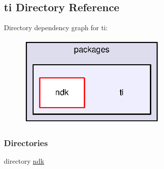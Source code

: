 \subsection{ti Directory Reference}
\label{dir_3f051719e97ef21bd60ea5e21f7dc6b4}
Directory dependency graph for ti\+:
\nopagebreak
\begin{figure}[H]
\begin{center}
\leavevmode
\includegraphics[width=211pt]{dir_3f051719e97ef21bd60ea5e21f7dc6b4_dep}
\end{center}
\end{figure}
\subsubsection*{Directories}
\begin{DoxyCompactItemize}
\item 
directory \hyperlink{dir_4af44f8452c145eb95f06f7fdbc159e6}{ndk}
\end{DoxyCompactItemize}
